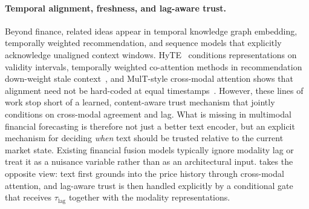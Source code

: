 \paragraph{Temporal alignment, freshness, and lag-aware trust.}
Beyond finance, related ideas appear in temporal knowledge graph embedding, temporally weighted recommendation, and sequence models that explicitly acknowledge unaligned context windows.
HyTE~\cite{dasgupta2018hyte} conditions representations on validity intervals, temporally weighted co-attention methods in recommendation down-weight stale context~\cite{liu2021temporal}, and MulT-style cross-modal attention shows that alignment need not be hard-coded at equal timestamps~\cite{tsai2019multimodal}.
However, these lines of work stop short of a learned, content-aware trust mechanism that jointly conditions on cross-modal agreement and lag.
What is missing in multimodal financial forecasting is therefore not just a better text encoder, but an explicit mechanism for deciding \emph{when} text should be trusted relative to the current market state.
Existing financial fusion models typically ignore modality lag or treat it as a nuisance variable rather than as an architectural input.
\CGCMA{} takes the opposite view: text first grounds into the price history through cross-modal attention, and lag-aware trust is then handled explicitly by a conditional gate that receives $\tau_{\mathrm{lag}}$ together with the modality representations.
